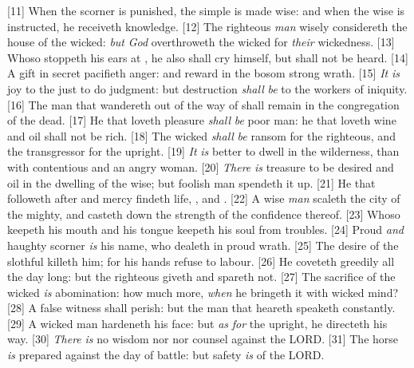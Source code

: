 [11] \textcolor[cmyk]{0.99998,1,0,0}{When the scorner is punished, the simple is made wise: and when the wise is instructed, he receiveth knowledge.}
[12] \textcolor[cmyk]{0.99998,1,0,0}{The righteous \emph{man} wisely considereth the house of the wicked: \emph{but} \emph{God} overthroweth the wicked for \emph{their} wickedness.}
[13] \textcolor[cmyk]{0.99998,1,0,0}{Whoso stoppeth his ears at , he also shall cry himself, but shall not be heard.}
[14] \textcolor[cmyk]{0.99998,1,0,0}{A gift in secret pacifieth anger: and  reward in the bosom strong wrath.}
[15] \textcolor[cmyk]{0.99998,1,0,0}{\emph{It} \emph{is} joy to the just to do judgment: but destruction \emph{shall} \emph{be} to the workers of iniquity.}
[16] \textcolor[cmyk]{0.99998,1,0,0}{The man that wandereth out of the way of  shall remain in the congregation of the dead.}
[17] \textcolor[cmyk]{0.99998,1,0,0}{He that loveth pleasure \emph{shall} \emph{be}  poor man: he that loveth wine and oil shall not be rich.}
[18] \textcolor[cmyk]{0.99998,1,0,0}{The wicked \emph{shall} \emph{be}  ransom for the righteous, and the transgressor for the upright.}
[19] \textcolor[cmyk]{0.99998,1,0,0}{\emph{It} \emph{is} better to dwell in the wilderness, than with  contentious and an angry woman.}
[20] \textcolor[cmyk]{0.99998,1,0,0}{\emph{There} \emph{is} treasure to be desired and oil in the dwelling of the wise; but  foolish man spendeth it up.}
[21] \textcolor[cmyk]{0.99998,1,0,0}{He that followeth after  and mercy findeth life, , and .}
[22] \textcolor[cmyk]{0.99998,1,0,0}{A wise \emph{man} scaleth the city of the mighty, and casteth down the strength of the confidence thereof.}
[23] \textcolor[cmyk]{0.99998,1,0,0}{Whoso keepeth his mouth and his tongue keepeth his soul from troubles.}
[24] \textcolor[cmyk]{0.99998,1,0,0}{Proud \emph{and} haughty scorner \emph{is} his name, who dealeth in proud wrath.}
[25] \textcolor[cmyk]{0.99998,1,0,0}{The desire of the slothful killeth him; for his hands refuse to labour.}
[26] \textcolor[cmyk]{0.99998,1,0,0}{He coveteth greedily all the day long: but the righteous giveth and spareth not.}
[27] \textcolor[cmyk]{0.99998,1,0,0}{The sacrifice of the wicked \emph{is} abomination: how much more, \emph{when} he bringeth it with  wicked mind?}
[28] \textcolor[cmyk]{0.99998,1,0,0}{A false witness shall perish: but the man that heareth speaketh constantly.}
[29] \textcolor[cmyk]{0.99998,1,0,0}{A wicked man hardeneth his face: but \emph{as} \emph{for} the upright, he directeth his way.}
[30] \textcolor[cmyk]{0.99998,1,0,0}{\emph{There} \emph{is} no wisdom nor  nor counsel against the LORD.}
[31] \textcolor[cmyk]{0.99998,1,0,0}{The horse \emph{is} prepared against the day of battle: but safety \emph{is} of the LORD.}



